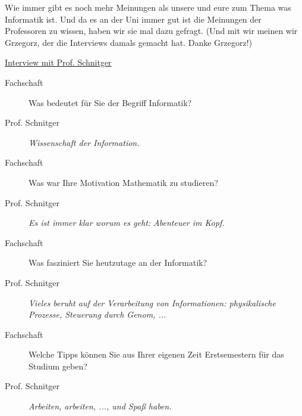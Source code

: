 \spaltenanfang
Wie immer gibt es noch mehr Meinungen als unsere und eure zum Thema was Informatik ist.
Und da es an der Uni immer gut ist die Meinungen der Professoren zu wissen, haben wir sie mal dazu gefragt.
(Und mit wir meinen wir Grzegorz, der die Interviews damals gemacht hat. Danke Grzegorz!)

\begin{flushleft}\underline{Interview mit Prof. Schnitger} \end{flushleft}

\begin{description}

\item[Fachschaft]

Was bedeutet für Sie der Begriff Informatik?

\item[Prof. Schnitger]

\textit{Wissenschaft der Information.}

\item[Fachschaft]

Was war Ihre Motivation Mathematik zu studieren?

\item[Prof. Schnitger]

\textit{Es ist immer klar worum es geht: Abenteuer im Kopf.}

\item[Fachschaft]

Was fasziniert Sie heutzutage an der Informatik?

\item[Prof. Schnitger]

\textit{Vieles beruht auf der Verarbeitung von Informationen: physikalische Prozesse, Steuerung durch Genom, ...}

\item[Fachschaft]

Welche Tipps können Sie aus Ihrer eigenen Zeit Erstsemestern für das Studium geben?

\item[Prof. Schnitger]

\textit{Arbeiten, arbeiten, ..., und Spaß haben.}

\end{description}

